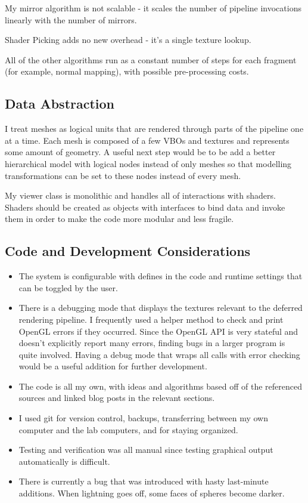 \documentclass{book}
\begin{document}
      My mirror algorithm is not scalable - it scales the number of pipeline invocations linearly with the number of mirrors.

      Shader Picking adds no new overhead - it's a single texture lookup.

      All of the other algorithms run as a constant number of steps for each fragment (for example, normal mapping), with possible pre-processing costs.

    \subsection{Data Abstraction}
      I treat meshes as logical units that are rendered through parts of the pipeline one at a time. Each mesh is composed of a few VBOs and textures and represents some amount of geometry. A useful next step would be to be add a better hierarchical model with logical nodes instead of only meshes so that modelling transformations can be set to these nodes instead of every mesh.

      My viewer class is monolithic and handles all of interactions with shaders. Shaders should be created as objects with interfaces to bind data and invoke them in order to make the code more modular and less fragile.

    \subsection{Code and Development Considerations}
      \begin{itemize}
        \item The system is configurable with defines in the code and runtime settings that can be toggled by the user.

        \item There is a debugging mode that displays the textures relevant to the deferred rendering pipeline. I frequently used a helper method to check and print OpenGL errors if they occurred. Since the OpenGL API is very stateful and doesn't explicitly report many errors, finding bugs in a larger program is quite involved. Having a debug mode that wraps all calls with error checking would be a useful addition for further development.

        \item The code is all my own, with ideas and algorithms based off of the referenced sources and linked blog posts in the relevant sections.

        \item I used git for version control, backups, transferring between my own computer and the lab computers, and for staying organized.

        \item Testing and verification was all manual since testing graphical output automatically is difficult.

        \item There is currently a bug that was introduced with hasty last-minute additions. When lightning goes off, some faces of spheres become darker.
    \end{itemize}
\end{document}
